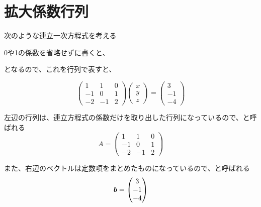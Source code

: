 \documentclass[../../../topic_linear-algebra]{subfiles}
\begin{document}
\sectionline
\section{拡大係数行列}

次のような連立一次方程式を考える

\br

\begin{center}
\end{center}

\br

0や1の係数を省略せずに書くと、

\br

\begin{center}
\end{center}

\br

となるので、これを行列で表すと、

\begin{equation*}
  \begin{pmatrix}
    1  & 1  & 0 \\
    -1 & 0  & 1 \\
    -2 & -1 & 2
  \end{pmatrix} \begin{pmatrix}
    x \\
    y \\
    z
  \end{pmatrix} = \begin{pmatrix}
    3  \\
    -1 \\
    -4
  \end{pmatrix}
\end{equation*}

\br

左辺の行列は、連立方程式の係数だけを取り出した行列になっているので、と呼ばれる
\begin{equation*}
  A = \begin{pmatrix}
    1  & 1  & 0 \\
    -1 & 0  & 1 \\
    -2 & -1 & 2
  \end{pmatrix}
\end{equation*}

\br

また、右辺のベクトルは定数項をまとめたものになっているので、と呼ばれる
\begin{equation*}
  \vb*{b} = \begin{pmatrix}
    3  \\
    -1 \\
    -4
  \end{pmatrix}
\end{equation*}
\end{document}
